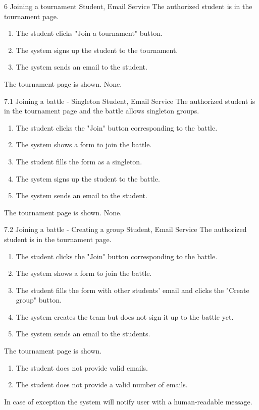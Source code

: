 \usecase
{6}
{Joining a tournament}
{Student, Email Service}
{The authorized student is in the tournament page.}
{
    \begin{enumerate}
        \item The student clicks "Join a tournament" button.
        \item The system signs up the student to the tournament.
        \item The system sends an email to the student.
    \end{enumerate}
}
{The tournament page is shown.}
{
    None.
}
{}

\clearpage

\usecase
{7.1}
{Joining a battle - Singleton}
{Student, Email Service}
{The authorized student is in the tournament page and the battle allows singleton groups.}
{
    \begin{enumerate}
        \item The student clicks the "Join" button corresponding to the battle.
        \item The system shows a form to join the battle.
        \item The student fills the form as a singleton.
        \item The system signs up the student to the battle.
        \item The system sends an email to the student.
    \end{enumerate}
}
{The tournament page is shown.}
{
    None.
}
{}

\clearpage

\usecase
{7.2}
{Joining a battle - Creating a group}
{Student, Email Service}
{The authorized student is in the tournament page.}
{
    \begin{enumerate}
        \item The student clicks the "Join" button corresponding to the battle.
        \item The system shows a form to join the battle.
        \item The student fills the form with other students' email and clicks the "Create group" button.
        \item The system creates the team but does not sign it up to the battle yet.
        \item The system sends an email to the students.
    \end{enumerate}
}
{The tournament page is shown.}
{
    \begin{enumerate}
        \item The student does not provide valid emails.
        \item The student does not provide a valid number of emails.
    \end{enumerate}

}
{
    In case of exception the system will notify user with a human-readable message.
}

